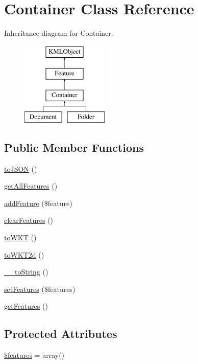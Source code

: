 \hypertarget{classContainer}{
\section{Container Class Reference}
\label{d0/d7b/classContainer}
}
Inheritance diagram for Container:\begin{figure}[H]
\begin{center}
\leavevmode
\includegraphics[height=4.000000cm]{d0/d7b/classContainer}
\end{center}
\end{figure}
\subsection*{Public Member Functions}
\begin{DoxyCompactItemize}
\item 
\hyperlink{classContainer_a61a8ba49aba4f10d8e4cd7a5336876b0}{toJSON} ()
\item 
\hyperlink{classContainer_a6a0cb42467f852550e10ad94aea7bcff}{getAllFeatures} ()
\item 
\hyperlink{classContainer_ac5a2f6ec26f2c3a915613e3d7ebcac20}{addFeature} (\$feature)
\item 
\hyperlink{classContainer_a9fe1dfd39e63c0d5bce14d192b91b4a6}{clearFeatures} ()
\item 
\hyperlink{classContainer_a6a80e0c5c46f903c6268ef9b0df7a93b}{toWKT} ()
\item 
\hyperlink{classContainer_a4c9e14a8c56574b8953488faca680085}{toWKT2d} ()
\item 
\hyperlink{classContainer_a127543c2c61f2c4a98faa9597079150b}{\_\-\_\-toString} ()
\item 
\hyperlink{classContainer_a3af4e4fe25d13cefc9a5b0d1f5b02459}{setFeatures} (\$features)
\item 
\hyperlink{classContainer_a9bd81e65717d1ae978b3ed732dc0bc0d}{getFeatures} ()
\end{DoxyCompactItemize}
\subsection*{Protected Attributes}
\begin{DoxyCompactItemize}
\item 
\hyperlink{classContainer_a3ca0e9148ad4c732b2a0957e285aadff}{\$features} = array()
\end{DoxyCompactItemize}


